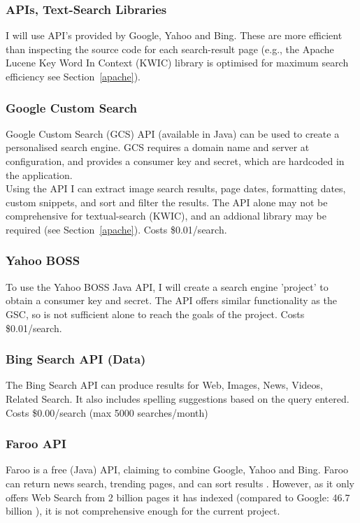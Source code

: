 \documentclass[a4paper, 11pt]{article}
\begin{document}
\subsubsection{APIs, Text-Search Libraries}
I will use API’s provided by Google, Yahoo and Bing. These are more efficient than inspecting the source code for each search-result page (e.g., the Apache Lucene Key Word In Context (KWIC) library is optimised for maximum search efficiency see Section~\ref{apache}). 

\subsubsection{Google Custom Search}
Google Custom Search (GCS) API (available in Java) can be used to create a personalised search engine. GCS requires a domain name and server at configuration, and provides a consumer key and secret, which are hardcoded in the application.\\
Using the API I can extract image search results, page dates, formatting dates, custom snippets, and sort and filter the results. The API alone may not be comprehensive for textual-search (KWIC), and an addional library may be required (see Section~\ref{apache}). Costs \$0.01/search.

\subsubsection{Yahoo BOSS}
To use the Yahoo BOSS Java API, I will create a search engine 'project' to obtain a consumer key and secret. The API offers similar functionality as the GSC, so is not sufficient alone to reach the goals of the project. Costs \$0.01/search.

\subsubsection{Bing Search API (Data)}
The Bing Search API can produce results for Web, Images, News, Videos, Related Search. It also includes spelling suggestions based on the query entered. Costs \$0.00/search (max 5000 searches/month)

\subsubsection{Faroo API}
Faroo is a free (Java) API, claiming to combine Google, Yahoo and Bing. Faroo can return news search, trending pages, and can sort results \cite{faroo}. However, as it only offers Web Search from 2 billion pages it has indexed (compared to Google: 46.7 billion \cite{websize}), it is not comprehensive enough for the current project.
\end{document}

